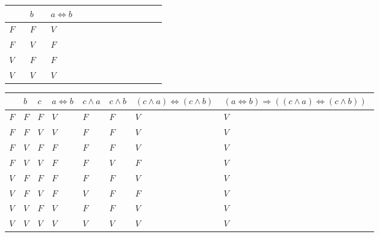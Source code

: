 \documentclass[12pt]{article}
\begin{document}
	\begin{center}
	\begin{longtable}{|>{\centering\arraybackslash}p{0.0999\linewidth}|>{\centering\arraybackslash}p{0.0999\linewidth}|>{\centering\arraybackslash}p{0.5\linewidth}|}
		\hline
		{\small $a$} & {\small $b$} & {\small $a\Leftrightarrow b$}\\ 
		\hline
		$F$ & $F$ & $V$\\ 
		\hline
		$F$ & $V$ & $F$\\ 
		\hline
		$V$ & $F$ & $F$\\ 
		\hline
		$V$ & $V$ & $V$\\ 
		\hline
	\end{longtable}\end{center}
	\begin{center}
	\begin{longtable}{|>{\centering\arraybackslash}p{0.0137\linewidth}|>{\centering\arraybackslash}p{0.0137\linewidth}|>{\centering\arraybackslash}p{0.0137\linewidth}|>{\centering\arraybackslash}p{0.0686\linewidth}|>{\centering\arraybackslash}p{0.0411\linewidth}|>{\centering\arraybackslash}p{0.0411\linewidth}|>{\centering\arraybackslash}p{0.1784\linewidth}|>{\centering\arraybackslash}p{0.3294\linewidth}|}
		\hline
		{\small $a$} & {\small $b$} & {\small $c$} & {\small $a\Leftrightarrow b$} & {\small $c\wedge a$} & {\small $c\wedge b$} & {\small $(c\wedge a)\Leftrightarrow (c\wedge b)$} & {\small $(a\Leftrightarrow b)\Rightarrow ((c\wedge a)\Leftrightarrow (c\wedge b))$}\\ 
		\hline
		$F$ & $F$ & $F$ & $V$ & $F$ & $F$ & $V$ & $V$\\ 
		\hline
		$F$ & $F$ & $V$ & $V$ & $F$ & $F$ & $V$ & $V$\\ 
		\hline
		$F$ & $V$ & $F$ & $F$ & $F$ & $F$ & $V$ & $V$\\ 
		\hline
		$F$ & $V$ & $V$ & $F$ & $F$ & $V$ & $F$ & $V$\\ 
		\hline
		$V$ & $F$ & $F$ & $F$ & $F$ & $F$ & $V$ & $V$\\ 
		\hline
		$V$ & $F$ & $V$ & $F$ & $V$ & $F$ & $F$ & $V$\\ 
		\hline
		$V$ & $V$ & $F$ & $V$ & $F$ & $F$ & $V$ & $V$\\ 
		\hline
		$V$ & $V$ & $V$ & $V$ & $V$ & $V$ & $V$ & $V$\\ 
		\hline
	\end{longtable}\end{center}
\end{document}
